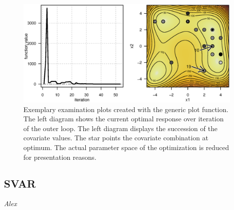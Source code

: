 \begin{figure}[htbp]
\centering
\includegraphics[width=1.025\textwidth]{Fig/fig2-ex2-plot.eps}
\caption{Exemplary examination plots created with the generic plot function. The left diagram shows the current optimal response over iteration of the outer loop. The left diagram displays the succession of the covariate values. The star points the covariate combination at optimum. The actual parameter space of the optimization is reduced for presentation reasons.}
\label{fig:fig2}
\end{figure}

\subsection{SVAR}
\textit{Alex}

